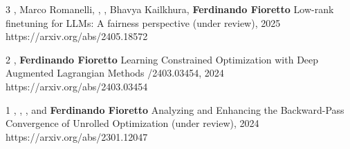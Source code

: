 \begin{pubs}
\wsentry
	{3}
	{,  Marco Romanelli, , , 
	Bhavya Kailkhura, {\bf Ferdinando Fioretto}}
	{Low-rank finetuning for LLMs: A fairness perspective}
	{ (under review), 2025}
	{https://arxiv.org/abs/2405.18572}


\wsentry
	{2}
	{, {\bf Ferdinando Fioretto}}
	{Learning Constrained Optimization with Deep Augmented Lagrangian Methods}
	{/2403.03454, 2024}
	{https://arxiv.org/abs/2403.03454}

\wsentry
	{1}
	{, , ,
	and {\bf Ferdinando Fioretto}}
	{Analyzing and Enhancing the Backward-Pass Convergence of Unrolled Optimization}	
	{ (under review), 2024}
	{https://arxiv.org/abs/2301.12047}

\end{pubs}


\setcounter{nW}{13}

